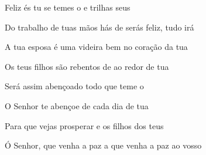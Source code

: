 \begin{greenumerate}
  \item {}Feliz és tu se temes o  e trilhas seus 

  \item {}Do trabalho de tuas mãos hás de  serás feliz, tudo irá 

  \item {}A tua esposa é uma videira bem  no coração da tua 

  \item {}Os teus filhos são rebentos de  ao redor de tua 

  \item {}Será assim abençoado todo  que teme o 

  \item {}O Senhor te abençoe de  cada dia de tua 

  \item {}Para que vejas prosperar  e os filhos dos teus 

  \item {}Ó Senhor, que venha a paz a  que venha a paz ao vosso 
\end{greenumerate}